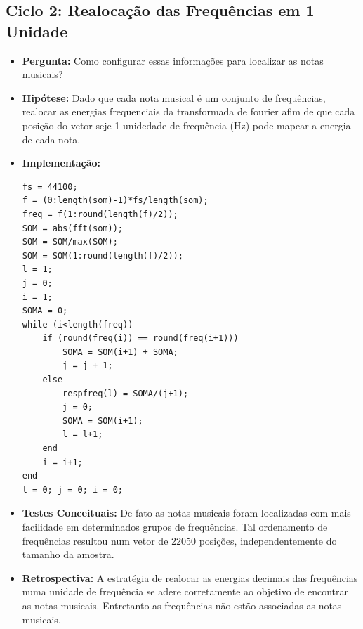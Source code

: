 \subsection{Ciclo 2: Realocação das Frequências em 1 Unidade}
\label{subsec:ciclo_2}
\begin{itemize}
\item \textbf{Pergunta:} Como configurar essas informações para localizar as notas musicais?
\item \textbf{Hipótese:} Dado que cada nota musical é um conjunto de frequências, realocar as energias frequenciais da transformada de fourier afim de que cada posição do vetor seje 1 unidedade de frequência (Hz) pode mapear a energia de cada nota.
\item \textbf{Implementação:} 
\begin{lstlisting}
fs = 44100;
f = (0:length(som)-1)*fs/length(som);
freq = f(1:round(length(f)/2));
SOM = abs(fft(som));
SOM = SOM/max(SOM);
SOM = SOM(1:round(length(f)/2));
l = 1;
j = 0;
i = 1;
SOMA = 0; 
while (i<length(freq))
    if (round(freq(i)) == round(freq(i+1)))
        SOMA = SOM(i+1) + SOMA;
        j = j + 1;
    else
        respfreq(l) = SOMA/(j+1);
        j = 0;
        SOMA = SOM(i+1);
        l = l+1;
    end
    i = i+1;
end
l = 0; j = 0; i = 0;
\end{lstlisting}
\item \textbf{Testes Conceituais:} De fato as notas musicais foram localizadas com mais facilidade em determinados grupos de frequências. Tal ordenamento de frequências resultou num vetor de 22050 posições, independentemente do tamanho da amostra.
\item \textbf{Retrospectiva:} A estratégia de realocar as energias decimais das frequências numa unidade de frequência se adere corretamente ao objetivo de encontrar as notas musicais. Entretanto as frequências não estão associadas as notas musicais.
\end{itemize}

